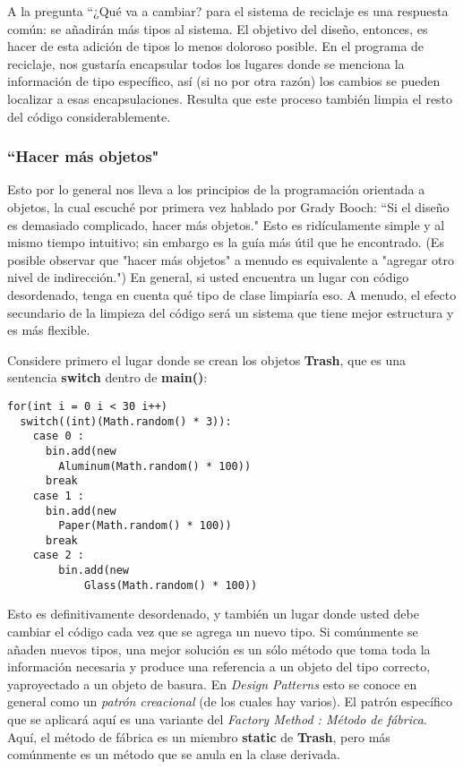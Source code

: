 
A la pregunta “¿Qué va a cambiar? para el sistema de reciclaje es una respuesta común: se añadirán más tipos al sistema. El objetivo del diseño, entonces, es hacer de esta adición de tipos lo menos doloroso posible. En el programa de reciclaje, nos gustaría encapsular todos los lugares donde se menciona la información de tipo específico, así (si no por otra razón) los cambios se pueden localizar a esas encapsulaciones. Resulta que este proceso también limpia el resto del código considerablemente.  \newline

\subsubsection*{“Hacer más objetos"}
\label{subsubsec:med}


Esto por lo general nos lleva a los principios de la programación orientada a objetos, la cual escuché por primera vez hablado por Grady Booch: “Si el diseño es demasiado complicado, hacer más objetos." Esto es ridículamente simple y al mismo tiempo intuitivo; sin embargo es la guía más útil que he encontrado. (Es posible observar que "hacer más objetos" a menudo es equivalente a "agregar otro nivel de indirección.") En general, si usted encuentra un lugar con código desordenado, tenga en cuenta qué tipo de clase limpiaría eso. A menudo, el efecto secundario de la limpieza del código será un sistema que tiene mejor estructura y es más flexible.    \newline

Considere primero el lugar donde se crean los objetos \textbf{Trash}, que es una sentencia \textbf{switch} dentro de \textbf{main()}:    \newline

\begin{lstlisting} 
for(int i = 0 i < 30 i++) 
  switch((int)(Math.random() * 3)): 
    case 0 : 
      bin.add(new 
        Aluminum(Math.random() * 100)) 
      break 
    case 1 : 
      bin.add(new 
        Paper(Math.random() * 100)) 
      break 
    case 2 : 
        bin.add(new 
            Glass(Math.random() * 100)) 
\end{lstlisting}

Esto es definitivamente desordenado, y también un lugar donde usted debe cambiar el código cada vez que se agrega un nuevo tipo. Si comúnmente se añaden nuevos tipos, una mejor solución es un sólo método que toma toda la información necesaria y produce una referencia a un objeto del tipo correcto, yaproyectado a un objeto de basura. En \textit{Design Patterns} esto se conoce en general como un \textit{patrón creacional} (de los cuales hay varios). El patrón específico que se aplicará aquí es una variante del \textit{Factory Method : Método de fábrica}. Aquí, el método de fábrica es un miembro \textbf{static} de \textbf{Trash}, pero más comúnmente es un método que se anula en la clase derivada.  \newline

